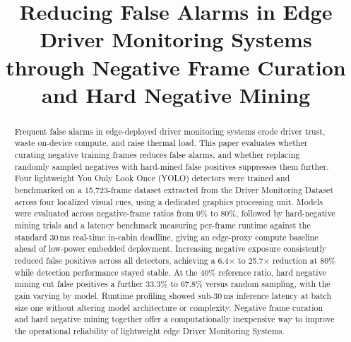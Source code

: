 \documentclass[conference]{IEEEtran}
\begin{document}
\title{Reducing False Alarms in Edge Driver Monitoring Systems through Negative Frame Curation and Hard Negative Mining}

\author{
  \and
  \and
}

\maketitle

\begin{abstract}
Frequent false alarms in edge-deployed driver monitoring systems erode driver trust, waste on-device compute, and raise thermal load. This paper evaluates whether curating negative training frames reduces false alarms, and whether replacing randomly sampled negatives with hard-mined false positives suppresses them further. Four lightweight You Only Look Once (YOLO) detectors were trained and benchmarked on a 15,723-frame dataset extracted from the Driver Monitoring Dataset across four localized visual cues, using a dedicated graphics processing unit. Models were evaluated across negative-frame ratios from 0\% to 80\%, followed by hard-negative mining trials and a latency benchmark measuring per-frame runtime against the standard 30\,ms real-time in-cabin deadline, giving an edge-proxy compute baseline ahead of low-power embedded deployment. Increasing negative exposure consistently reduced false positives across all detectors, achieving a 6.4× to 25.7× reduction at 80\% while detection performance stayed stable. At the 40\% reference ratio, hard negative mining cut false positives a further 33.3\% to 67.8\% versus random sampling, with the gain varying by model. Runtime profiling showed sub-30\,ms inference latency at batch size one without altering model architecture or complexity. Negative frame curation and hard negative mining together offer a computationally inexpensive way to improve the operational reliability of lightweight edge Driver Monitoring Systems.
\end{abstract}  
\end{document}
